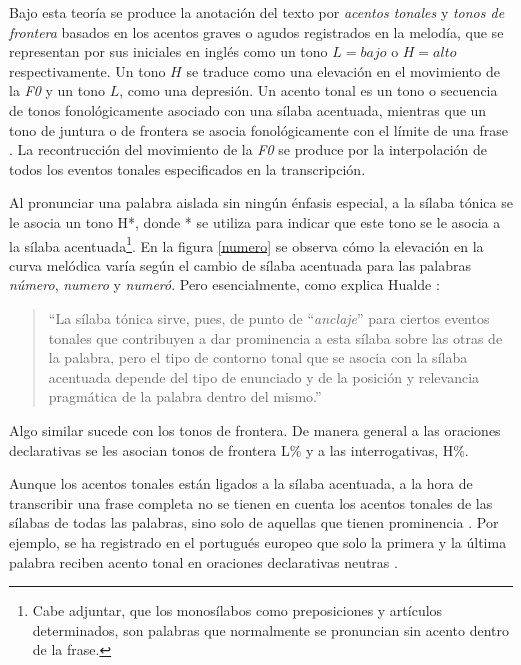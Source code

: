 Bajo esta teor\'ia se produce la anotaci\'on del texto por \emph{acentos tonales} y \emph{tonos de frontera} basados en los acentos graves o agudos registrados en la melod\'ia, que se representan por sus iniciales en ingl\'es como un tono $L = bajo$ o $H = alto$ respectivamente. Un tono $H$ se traduce como una elevaci\'on en el movimiento de la \emph{F0} y un tono $L$, como una depresi\'on. Un acento tonal es un tono o secuencia de tonos fonológicamente asociado con una sílaba acentuada, mientras que un tono de juntura o de frontera se asocia fonológicamente con el límite de una frase . La recontrucci\'on del movimiento de la \emph{F0} se produce por la interpolaci\'on de todos los eventos tonales especificados en la transcripci\'on.


Al pronunciar una palabra aislada sin ning\'un \'enfasis especial, a la s\'ilaba t\'onica se le asocia un tono H*, donde * se utiliza para indicar que este tono se le asocia a la s\'ilaba acentuada\footnote{Cabe adjuntar, que los monosílabos como preposiciones y artículos determinados, son palabras que normalmente se pronuncian sin acento dentro de la frase.}. En la figura \ref{numero} se observa c\'omo la elevaci\'on en la curva mel\'odica var\'ia seg\'un el cambio de s\'ilaba acentuada para las palabras \emph{n\'umero}, \emph{numero} y \emph{numer\'o}. Pero esencialmente, como explica Hualde \cite{hualde2003modelo}:



\begin{quote}
 ``{La s\'ilaba t\'onica sirve, pues, de punto de “\emph{anclaje}” para ciertos eventos tonales que contribuyen a dar prominencia a esta s\'ilaba sobre las otras de la palabra, pero el tipo de contorno tonal que se asocia con la s\'ilaba acentuada depende del tipo de enunciado y de la posici\'on y relevancia pragm\'atica de la palabra dentro del mismo.}''
\end{quote}

Algo similar sucede con los tonos de frontera. De manera general a las oraciones declarativas se les asocian tonos de frontera L\% y a las interrogativas, H\%.


Aunque los acentos tonales est\'an ligados a la s\'ilaba acentuada, a la hora de transcribir una frase completa no se tienen en cuenta los acentos tonales de las s\'ilabas de todas las palabras, sino solo de aquellas que tienen prominencia  \cite{pierrehumbert1980phonology}. Por ejemplo, se ha registrado en el portugu\'es europeo que solo la primera y la \'ultima palabra reciben acento tonal en oraciones declarativas neutras \cite{hualde2003modelo}.

